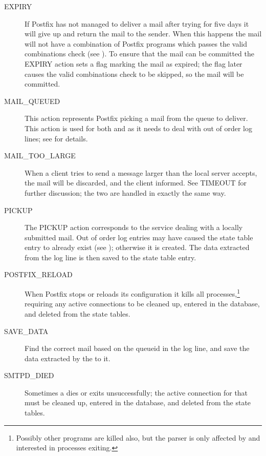 \begin{description}
    \item [EXPIRY] If Postfix has not managed to deliver a mail after
        trying for five days it will give up and return the mail to the
        sender.  When this happens the mail will not have a combination of
        Postfix programs which passes the valid combinations check (see
        ).  To ensure that the mail can
        be committed the EXPIRY action sets a flag marking the mail as
        expired; the flag later causes the valid combinations check to be
        skipped, so the mail will be committed.

    \item [MAIL\_QUEUED] This action represents Postfix
        picking a mail from the queue to deliver. This action is used for
        both  and  as it needs to deal with
        out of order log lines; see 
        for details.

    \item [MAIL\_TOO\_LARGE] When a client tries to send a message larger
        than the local server accepts, the mail will be discarded, and the
        client informed.  See TIMEOUT for further discussion; the two are
        handled in exactly the same way.

    \item [PICKUP] The PICKUP action corresponds to the 
        service dealing with a locally submitted mail.  Out of order log
        entries may have caused the state table entry to already exist (see
        ); otherwise it is
        created.  The data extracted from the log line is then saved to the
        state table entry.

    \item [POSTFIX\_RELOAD] When Postfix stops or reloads its configuration
        it kills all  processes,\footnote{Possibly other
        programs are killed also, but the parser is only affected by and
        interested in  processes exiting.} requiring any
        active connections to be cleaned up, entered in the database, and
        deleted from the state tables.

    \item [SAVE\_DATA] Find the correct mail based on the queueid in
        the log line, and save the data extracted by the \regex{} to it.

    \item [SMTPD\_DIED] Sometimes a  dies or exits
        unsuccessfully; the active connection for that  must
        be cleaned up, entered in the database, and deleted from the state
        tables.


\end{description}
